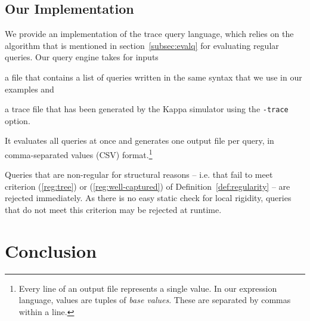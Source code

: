 \documentclass[runningheads]{llncs}
\begin{document}
\subsection{Our Implementation}

We provide an implementation of the trace query language, which relies
on the algorithm that is mentioned in section~\ref{subsec:evalq} for
evaluating regular queries. Our query engine takes for inputs
\begin{inparaenum}[(i)]
\item a file that contains a list of queries written in the same
  syntax that we use in our examples and
\item a trace file that has been generated by the Kappa simulator
  using the \texttt{-trace} option.
\end{inparaenum}
It evaluates all queries at once and generates one output file per
query, in comma-separated values (CSV) format.\footnote{Every line of
  an output file represents a single value. In our expression
  language, values are tuples of \emph{base values}. These are
  separated by commas within a line.}

Queries that are non-regular for structural reasons -- i.e. that fail to
meet criterion (\ref{reg:tree}) or (\ref{reg:well-captured}) of
Definition~\ref{def:regularity} -- are rejected immediately.  As there
is no easy static check for local rigidity, 
queries that do not meet this criterion may be rejected at runtime. 




\iffalse
However, the first users of our query engine never expressed any
frustration with it, as they naturally came up with regular queries
only.\footnote{Furthermore, they would also write the clauses of their
  patterns in an order that reflects their dependency trees.}  In our
opinion, this is due to the difficulty of interpreting non-regular
queries operationally.
\fi




\newpage 




\newpage

\section{Conclusion}
\end{document}
